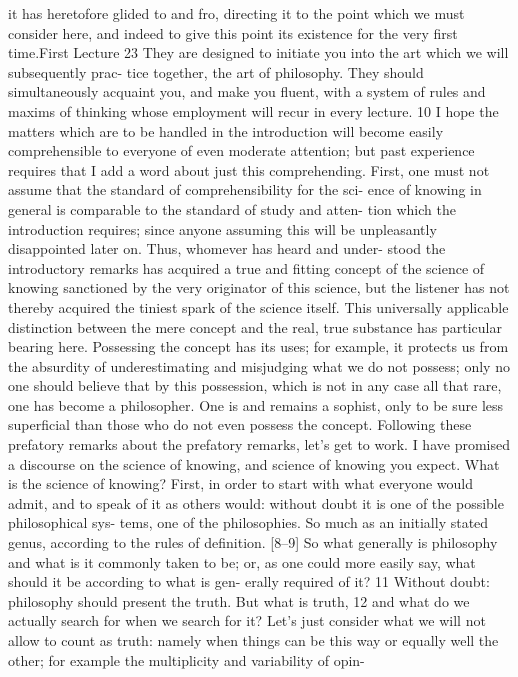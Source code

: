 it has heretofore glided to and fro, directing it to the point which we must
consider here, and indeed to give this point its existence for the very first time.First Lecture
23
They are designed to initiate you into the art which we will subsequently prac-
tice together, the art of philosophy. They should simultaneously acquaint you,
and make you fluent, with a system of rules and maxims of thinking whose
employment will recur in every lecture. 10
I hope the matters which are to be handled in the introduction will
become easily comprehensible to everyone of even moderate attention; but
past experience requires that I add a word about just this comprehending.
First, one must not assume that the standard of comprehensibility for the sci-
ence of knowing in general is comparable to the standard of study and atten-
tion which the introduction requires; since anyone assuming this will be
unpleasantly disappointed later on. Thus, whomever has heard and under-
stood the introductory remarks has acquired a true and fitting concept of the
science of knowing sanctioned by the very originator of this science, but the
listener has not thereby acquired the tiniest spark of the science itself. This
universally applicable distinction between the mere concept and the real, true
substance has particular bearing here. Possessing the concept has its uses; for
example, it protects us from the absurdity of underestimating and misjudging
what we do not possess; only no one should believe that by this possession,
which is not in any case all that rare, one has become a philosopher. One is
and remains a sophist, only to be sure less superficial than those who do not
even possess the concept.
Following these prefatory remarks about the prefatory remarks, let’s get
to work.
I have promised a discourse on the science of knowing, and science of
knowing you expect. What is the science of knowing?
First, in order to start with what everyone would admit, and to speak of
it as others would: without doubt it is one of the possible philosophical sys-
tems, one of the philosophies. So much as an initially stated genus, according
to the rules of definition.
[8–9] So what generally is philosophy and what is it commonly taken to
be; or, as one could more easily say, what should it be according to what is gen-
erally required of it? 11
Without doubt: philosophy should present the truth. But what is truth, 12
and what do we actually search for when we search for it? Let’s just consider
what we will not allow to count as truth: namely when things can be this way
or equally well the other; for example the multiplicity and variability of opin-

